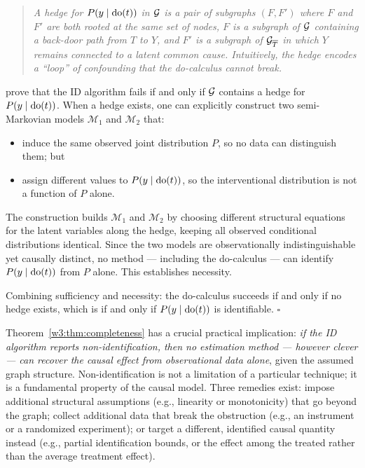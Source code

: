\documentclass[master.tex]{subfiles}
\begin{document}
\begin{tcolorbox}[defstyle, title={Proof Sketch and the ID Algorithm}]
\begin{quote}
\textit{A \emph{hedge} for $P(y \mid \mathrm{do}(t))$ in $\mathcal{G}$ is a pair of
subgraphs $(F, F')$ where $F$ and $F'$ are both rooted at the same set of
nodes, $F$ is a subgraph of $\mathcal{G}$ containing a back-door path from $T$
to $Y$, and $F'$ is a subgraph of $\mathcal{G}_{\overline{T}}$ in which $Y$
remains connected to a latent common cause.  Intuitively, the hedge
encodes a ``loop'' of confounding that the do-calculus cannot break.}
\end{quote}

\citet{shpitser2006identification} prove that the ID algorithm fails if and
only if $\mathcal{G}$ contains a hedge for $P(y \mid \mathrm{do}(t))$.  When a hedge
exists, one can explicitly construct two semi-Markovian models
$\mathcal{M}_1$ and $\mathcal{M}_2$ that:
\begin{itemize}
  \item induce the same observed joint distribution $P$, so no data can
        distinguish them; but
  \item assign different values to $P(y \mid \mathrm{do}(t))$, so the
        interventional distribution is not a function of $P$ alone.
\end{itemize}
The construction builds $\mathcal{M}_1$ and $\mathcal{M}_2$ by choosing
different structural equations for the latent variables along the hedge,
keeping all observed conditional distributions identical.  Since the two
models are observationally indistinguishable yet causally distinct, no
method --- including the do-calculus --- can identify $P(y \mid \mathrm{do}(t))$
from $P$ alone.  This establishes necessity.

Combining sufficiency and necessity: the do-calculus succeeds if and only
if no hedge exists, which is if and only if $P(y \mid \mathrm{do}(t))$ is
identifiable. $\square$
\end{tcolorbox}

\begin{remark}
Theorem~\ref{w3:thm:completeness} has a crucial practical implication:
\emph{if the ID algorithm reports non-identification, then no estimation
method --- however clever --- can recover the causal effect from
observational data alone}, given the assumed graph structure.
Non-identification is not a limitation of a particular technique; it is a
fundamental property of the causal model.  Three remedies exist: impose
additional structural assumptions (e.g., linearity or monotonicity) that
go beyond the graph; collect additional data that break the obstruction
(e.g., an instrument or a randomized experiment); or target a different,
identified causal quantity instead (e.g., partial identification bounds,
or the effect among the treated rather than the average treatment effect).
\end{remark}
\end{document}
